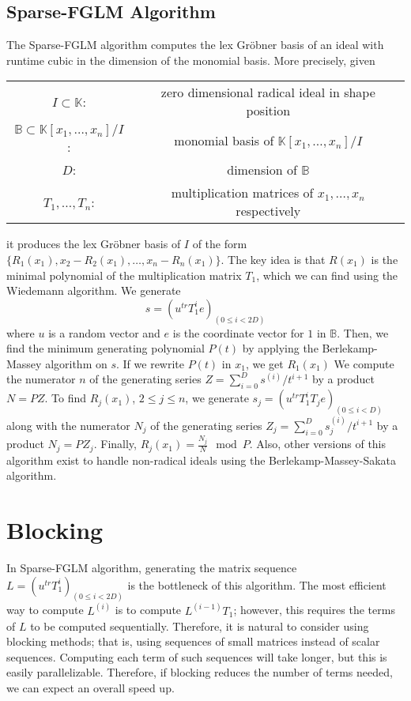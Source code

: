 \documentclass[12pt]{article}
\begin{document}
\subsection{Sparse-FGLM Algorithm}
The Sparse-FGLM algorithm \cite{FaMo17} computes the lex
Gr\"obner basis of an ideal with runtime cubic in the dimension
of the monomial basis. More precisely, given

\begin{center}
\begin{tabular}{c c}
	$I \subset \mathbb{K}$:& zero dimensional radical ideal
	in shape position\\
	$\mathbb{B} \subset \mathbb{K}[x_1,\dots,x_n]/I$:&
	monomial basis of $\mathbb{K}[x_1,\dots,x_n]/I$\\
	$D$: & dimension of $\mathbb{B}$\\
	$T_1,\dots,T_n$:& multiplication matrices of
	$x_1,\dots,x_n$ respectively	
\end{tabular}
\end{center}
it produces the lex Gr\"obner basis of $I$ of the form
$\{ R_1(x_1), x_2-R_2(x_1),\dots, x_n - R_n(x_1)  \}$.
The key idea is that $R(x_1)$ is the minimal polynomial
of the multiplication matrix $T_1$, which we can
find using the Wiedemann algorithm. We generate
$$ s = (u^{tr} T^i_1 e)_{(0 \le i < 2D)}$$
where $u$ is a random vector and $e$ is the coordinate
vector for $1$ in $\mathbb{B}$. Then, we find the minimum
generating polynomial $P(t)$ by
applying the Berlekamp-Massey algorithm on $s$.
If we rewrite $P(t)$ in $x_1$, we get $R_1(x_1)$
We compute the numerator $n$ of the generating series
$Z = \sum_{i=0}^{D} s^{(i)}/t^{i+1}$ by a product
$N = P Z$. To find $R_j(x_1)$, $2 \le j \le n$, we
generate $s_j = (u^{tr} T_1^i T_j e)_{(0 \le i < D)}$
along with the numerator $N_j$ of the generating series
$Z_j = \sum_{i=0}^{D} s_j^{(i)} / t^{i+1}$ by a product
$N_j = P Z_j$. Finally, $R_j(x_1) = \frac{N_j}{N} \mod P$.
Also, other versions of this algorithm exist to handle
non-radical ideals using the Berlekamp-Massey-Sakata algorithm.

\newpage
\section{Blocking}
In Sparse-FGLM algorithm, generating the matrix sequence 
$L = (u^{tr} T_1^i)_{(0 \le i < 2D)}$ is the bottleneck of this
algorithm. The most efficient way to compute $L^{(i)}$ is
to compute $L^{(i-1)}T_1$; however, this requires the terms
of $L$ to be computed sequentially. Therefore, it is natural to
consider using blocking methods; that is, using
sequences of small matrices instead of scalar
sequences. Computing each
term of such sequences will take longer, but this is easily
parallelizable. Therefore, if blocking reduces the number of terms
needed, we can expect an overall speed up.
\end{document}

